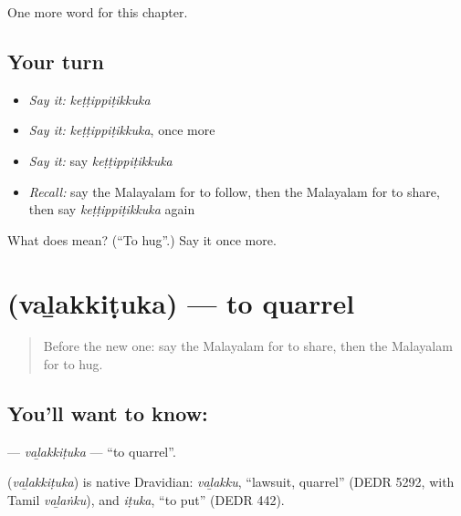 \begin{grammarlens}[title={What you've built}]
One more word for this chapter.
\end{grammarlens}

\subsection*{Your turn}
\begin{itemize}
\raggedright
  \item \emph{Say it:} \emph{keṭṭippiṭikkuka}
  \item \emph{Say it:} \emph{keṭṭippiṭikkuka}, once more
  \item \emph{Say it:} say \emph{keṭṭippiṭikkuka}
  \item \emph{Recall:} say the Malayalam for to follow, then the Malayalam for to share, then say \emph{keṭṭippiṭikkuka} again
\end{itemize}

\begin{tcolorbox}[breakable,colback=teal!4,colframe=teal!35!black,title={Before you move on}]
What does  mean? (\textquotedblleft{}To hug\textquotedblright{}.) Say it once more.
\end{tcolorbox}
\section[\texorpdfstring{\ml{വഴക്കിടുക} (vaḻakkiṭuka)}{വഴക്കിടുക (vaḻakkiṭuka)}]{ (vaḻakkiṭuka) — to quarrel}

\label{lesson:ML-C186-valakkituka}



\begin{quote}
Before the new one: say the Malayalam for to share, then the Malayalam for to hug.
\end{quote}

\subsection*{You'll want to know: }
\textbf{} — \emph{vaḻakkiṭuka} — \textquotedblleft{}to quarrel\textquotedblright{}.

\begin{cousinweb}
\textbf{} (\emph{vaḻakkiṭuka}) is native Dravidian: \emph{vaḻakku}, \textquotedblleft{}lawsuit, quarrel\textquotedblright{} (DEDR 5292, with Tamil \emph{vaḻaṅku}), and \emph{iṭuka}, \textquotedblleft{}to put\textquotedblright{} (DEDR 442).
\end{cousinweb}

